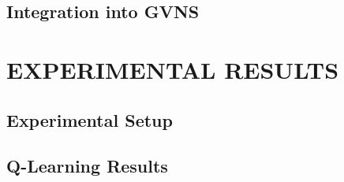 \documentclass[final,11pt,times]{elsarticle}
\begin{document}


\subsection{Integration into GVNS}



\section{EXPERIMENTAL RESULTS}
\label{sec:results}

\subsection{Experimental Setup}



\subsection{Q-Learning Results}
\end{document}

